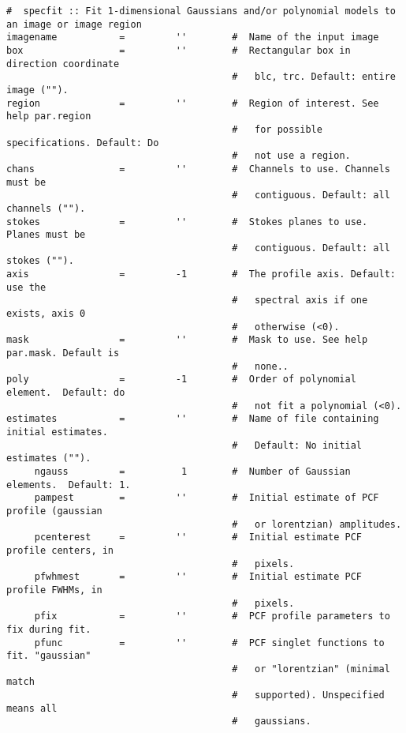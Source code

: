 \small
\begin{verbatim}
#  specfit :: Fit 1-dimensional Gaussians and/or polynomial models to an image or image region
imagename           =         ''        #  Name of the input image
box                 =         ''        #  Rectangular box in direction coordinate
                                        #   blc, trc. Default: entire image ("").
region              =         ''        #  Region of interest. See help par.region
                                        #   for possible specifications. Default: Do
                                        #   not use a region.
chans               =         ''        #  Channels to use. Channels must be
                                        #   contiguous. Default: all channels ("").
stokes              =         ''        #  Stokes planes to use. Planes must be
                                        #   contiguous. Default: all stokes ("").
axis                =         -1        #  The profile axis. Default: use the
                                        #   spectral axis if one exists, axis 0
                                        #   otherwise (<0).
mask                =         ''        #  Mask to use. See help par.mask. Default is
                                        #   none..
poly                =         -1        #  Order of polynomial element.  Default: do
                                        #   not fit a polynomial (<0).
estimates           =         ''        #  Name of file containing initial estimates.
                                        #   Default: No initial estimates ("").
     ngauss         =          1        #  Number of Gaussian elements.  Default: 1.
     pampest        =         ''        #  Initial estimate of PCF profile (gaussian
                                        #   or lorentzian) amplitudes.
     pcenterest     =         ''        #  Initial estimate PCF profile centers, in
                                        #   pixels.
     pfwhmest       =         ''        #  Initial estimate PCF profile FWHMs, in
                                        #   pixels.
     pfix           =         ''        #  PCF profile parameters to fix during fit.
     pfunc          =         ''        #  PCF singlet functions to fit. "gaussian"
                                        #   or "lorentzian" (minimal match
                                        #   supported). Unspecified means all
                                        #   gaussians.


\end{verbatim}
